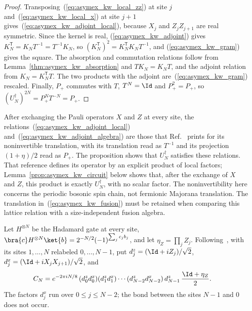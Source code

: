 \begin{proof}
    \leanok
    Transposing~(\ref{eq:asymex_kw_local_zz}) at
    site $j$ and~(\ref{eq:asymex_kw_local_x}) at site $j+1$
    gives~(\ref{eq:asymex_kw_adjoint_local}), because $X_j$ and
    $Z_jZ_{j+1}$ are real symmetric. Since the kernel is real,
    (\ref{eq:asymex_kw_adjoint}) gives
    $K_N^{\mathsf T}=K_NT^{-1}=T^{-1}K_N$, so
    $(K_N^{\mathsf T})^2=K_N^{\mathsf T}K_NT^{-1}$, and
    (\ref{eq:asymex_kw_gram}) gives the square. The absorption and
    commutation relations follow from
    Lemma~\ref{thm:asymex_kw_absorption} and $TK_N=K_NT$, and the
    adjoint relation from $K_N=K_N^{\mathsf T}T$. The two products
    with the adjoint are~(\ref{eq:asymex_kw_gram}) rescaled. Finally,
    $P_+$ commutes with $T$, $T^N=\Id$ and $P_+^2=P_+$, so
    $(U_N^\dagger)^{2N}=P_+^NT^{-N}=P_+$.
\end{proof}

After exchanging the Pauli operators $X$ and $Z$ at every site, the
relations~(\ref{eq:asymex_kw_adjoint_local})
and~(\ref{eq:asymex_kw_adjoint_algebra}) are those that
Ref.~\cite{Seiberg2024Majorana} prints for its noninvertible
translation, with its translation read as $T^{-1}$ and its projection
$(1+\eta)/2$ read as $P_+$. The proposition shows that $U_N^\dagger$
satisfies these relations. That reference defines its operator by an
explicit product of local factors; Lemma~\ref{prop:asymex_kw_circuit}
below shows that, after the exchange of $X$ and $Z$, this product is
exactly $U_N^\dagger$, with no scalar factor.
The noninvertibility here concerns
the periodic bosonic spin chain, not fermionic Majorana translation.
The translation in~(\ref{eq:asymex_kw_fusion}) must be retained when
comparing this lattice relation with a size-independent fusion algebra.

\begin{definition}
    \label{def:asymex_kw_circuit}
    \leanok
    Let $H^{\otimes N}$ be the Hadamard gate at every site,
    $\bra{c}H^{\otimes N}\ket{b}=2^{-N/2}(-1)^{\sum_jc_jb_j}$, and let
    $\eta_Z=\prod_jZ_j$. Following~\cite{Seiberg2024Majorana}, with its
    sites $1,\ldots,N$ relabeled $0,\ldots,N-1$, put
    $d^z_j=(\Id+iZ_j)/\sqrt2$, $d^x_j=(\Id+iX_jX_{j+1})/\sqrt2$, and
    \begin{align}
        C_N & =e^{-2\pi iN/8}\,(d^z_0d^x_0)(d^z_1d^x_1)\cdots
        (d^z_{N-2}d^x_{N-2})\,d^z_{N-1}\,\frac{\Id+\eta_Z}{2}.
        \label{eq:asymex_kw_circuit_def}
    \end{align}
    The factors $d^x_j$ run over $0\leq j\leq N-2$; the bond between the
    sites $N-1$ and $0$ does not occur.
\end{definition}


